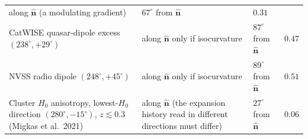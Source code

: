 \documentclass[
  11pt,
]{article}
\begin{document}
\begin{longtable}[]{@{}llll@{}}
\begin{minipage}[t]{0.22\columnwidth}
along \(\hat{\mathbf n}\) (a modulating gradient)\strut
\end{minipage} & \begin{minipage}[t]{0.22\columnwidth}\raggedright
\(67^\circ\) from \(\hat{\mathbf n}\)\strut
\end{minipage} & \begin{minipage}[t]{0.22\columnwidth}\raggedright
\(0.31\)\strut
\end{minipage}\tabularnewline
\begin{minipage}[t]{0.22\columnwidth}\raggedright
CatWISE quasar-dipole excess \((238^\circ, +29^\circ)\)\strut
\end{minipage} & \begin{minipage}[t]{0.22\columnwidth}\raggedright
along \(\hat{\mathbf n}\) only if isocurvature\strut
\end{minipage} & \begin{minipage}[t]{0.22\columnwidth}\raggedright
\(87^\circ\) from \(\hat{\mathbf n}\)\strut
\end{minipage} & \begin{minipage}[t]{0.22\columnwidth}\raggedright
\(0.47\)\strut
\end{minipage}\tabularnewline
\begin{minipage}[t]{0.22\columnwidth}\raggedright
NVSS radio dipole \((248^\circ, +45^\circ)\)\strut
\end{minipage} & \begin{minipage}[t]{0.22\columnwidth}\raggedright
along \(\hat{\mathbf n}\) only if isocurvature\strut
\end{minipage} & \begin{minipage}[t]{0.22\columnwidth}\raggedright
\(89^\circ\) from \(\hat{\mathbf n}\)\strut
\end{minipage} & \begin{minipage}[t]{0.22\columnwidth}\raggedright
\(0.51\)\strut
\end{minipage}\tabularnewline
\begin{minipage}[t]{0.22\columnwidth}\raggedright
Cluster \(H_0\) anisotropy, lowest-\(H_0\) direction
\((280^\circ, -15^\circ)\), \(z \lesssim 0.3\) (Migkas et
al.~2021)\strut
\end{minipage} & \begin{minipage}[t]{0.22\columnwidth}\raggedright
along \(\hat{\mathbf n}\) (the expansion history read in different
directions must differ)\strut
\end{minipage} & \begin{minipage}[t]{0.22\columnwidth}\raggedright
\(27^\circ\) from \(\hat{\mathbf n}\)\strut
\end{minipage} & \begin{minipage}[t]{0.22\columnwidth}\raggedright
\(0.06\)\strut
\end{minipage}\tabularnewline
\bottomrule
\end{longtable}
\end{document}
